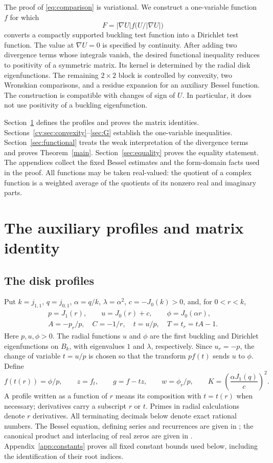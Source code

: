 \documentclass[11pt]{article}
\theoremstyle{remark}
\begin{document}
The proof of \eqref{eq:comparison} is variational. We construct a
one-variable function $f$ for which
\[
 F=|\nabla U|f\bigl(U/|\nabla U|\bigr)
\]
converts a compactly supported buckling test function into a Dirichlet
test function. The value at $\nabla U=0$ is specified by continuity.
After adding two divergence terms whose integrals vanish, the desired
functional inequality reduces to positivity of a symmetric matrix.
Its kernel is determined by the radial disk eigenfunctions. The
remaining $2\times2$ block is controlled by convexity, two Wronskian
comparisons, and a residue expansion for an auxiliary Bessel function.
The construction is compatible with changes of sign of $U$. In
particular, it does not use positivity of a buckling eigenfunction.

Section~\ref{sec:calibration} defines the profiles and proves the matrix
identities. Sections~\ref{cv:sec:convexity}--\ref{sec:G} establish the
one-variable inequalities. Section~\ref{sec:functional} treats the weak
interpretation of the divergence terms and proves Theorem~\ref{main}.
Section~\ref{sec:equality} proves the equality statement. The
appendices collect the fixed Bessel estimates and the form-domain facts
used in the proof. All functions may be taken real-valued: the quotient
of a complex function is a weighted average of the quotients of its
nonzero real and imaginary parts.

\section{The auxiliary profiles and matrix identity}\label{sec:calibration}
\subsection{The disk profiles}
Put $k=j_{1,1}$, $q=j_{0,1}$, $\alpha=q/k$,
$\lambda=\alpha^2$, $c=-J_0(k)>0$, and, for $0<r<k$,
\[
 \begin{gathered}
 p=J_1(r),\qquad u=J_0(r)+c,\qquad \phi=J_0(\alpha r),\\
 A=-p_r/p,\quad C=-1/r,\quad t=u/p,\quad T=t_r=tA-1.
 \end{gathered}
\]
Here $p,u,\phi>0$. The radial functions $u$ and $\phi$ are the
first buckling and Dirichlet eigenfunctions on $B_k$, with eigenvalues
$1$ and $\lambda$, respectively. Since $u_r=-p$, the change of variable
$t=u/p$ is chosen so that the transform $p f(t)$ sends $u$ to $\phi$.
Define
\[
 f(t(r))=\phi/p,\qquad z=f_t,\qquad g=f-tz,\qquad
 w=\phi_r/p,
 \qquad
 K=\left(\frac{\alpha J_1(q)}c\right)^2.
\]
A profile written as a function of $r$ means its composition with
$t=t(r)$ when necessary; derivatives carry a subscript $r$ or $t$. Primes in radial calculations
denote $r$ derivatives. All terminating decimals below denote exact
rational numbers.
The Bessel equation, defining series and recurrences are given in
\cite[Eqs.~10.2.1--10.2.2 and 10.6.1--10.6.3]{DLMF};
the canonical product and interlacing of real zeros are given in
\cite[Eqs.~10.21.15 and 10.21.2]{DLMF}.
Appendix~\ref{app:constants} proves all fixed constant bounds used below,
including the identification of their root indices.
\end{document}
